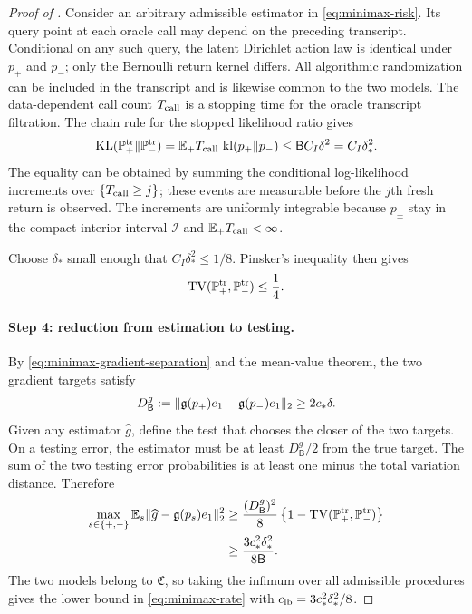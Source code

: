 \begin{proof}[Proof of ]
Consider an arbitrary admissible estimator in \eqref{eq:minimax-risk}.  Its query point at each oracle call may depend on the preceding transcript.  Conditional on any such query, the latent Dirichlet action law is identical under $p_+$ and $p_-$; only the Bernoulli return kernel differs.  All algorithmic randomization can be included in the transcript and is likewise common to the two models.  The data-dependent call count $T_{\rm call}$ is a stopping time for the oracle transcript filtration.  The chain rule for the stopped likelihood ratio gives
\begin{equation}\label{eq:stopped-transcript-kl}
 \operatorname{KL}(\mathbb P_+^{\rm tr}\Vert\mathbb P_-^{\rm tr})
 =\mathbb E_+T_{\rm call}\,\operatorname{kl}(p_+\Vert p_-)
 \le \mathsf B C_I\delta^2=C_I\delta_*^2.
\end{equation}
The equality can be obtained by summing the conditional log-likelihood increments over
$\{T_{\rm call}\ge j\}$; these events are measurable before the $j$th fresh return is observed.  The increments are uniformly integrable because $p_\pm$ stay in the compact interior interval $\mathcal I$ and $\mathbb E_+T_{\rm call}<\infty$.

Choose $\delta_*$ small enough that $C_I\delta_*^2\le1/8$.  Pinsker's inequality then gives
\begin{equation}\label{eq:minimax-tv}
 \operatorname{TV}(\mathbb P_+^{\rm tr},\mathbb P_-^{\rm tr})\le\frac14.
\end{equation}

\paragraph{Step 4: reduction from estimation to testing.}
By \eqref{eq:minimax-gradient-separation} and the mean-value theorem, the two gradient targets satisfy
\begin{equation}\label{eq:minimax-target-distance}
 D_{\mathsf B}^g
 :=\lVert\mathfrak g(p_+)e_1-\mathfrak g(p_-)e_1\rVert_2
 \ge2c_*\delta.
\end{equation}
Given any estimator $\widehat g$, define the test that chooses the closer of the two targets.  On a testing error, the estimator must be at least $D_{\mathsf B}^g/2$ from the true target.  The sum of the two testing error probabilities is at least one minus the total variation distance.  Therefore
\begin{align*}
 \max_{s\in\{+,-\}}
 \mathbb E_s\lVert\widehat g-\mathfrak g(p_s)e_1\rVert_2^2
 &\ge \frac{(D_{\mathsf B}^g)^2}{8}
 \left\{1-\operatorname{TV}(\mathbb P_+^{\rm tr},\mathbb P_-^{\rm tr})\right\}\\
 &\ge \frac{3c_*^2\delta_*^2}{8\mathsf B}.
\end{align*}
The two models belong to $\mathfrak C$, so taking the infimum over all admissible procedures gives the lower bound in \eqref{eq:minimax-rate} with
$c_{\rm lb}=3c_*^2\delta_*^2/8$.


\end{proof}
